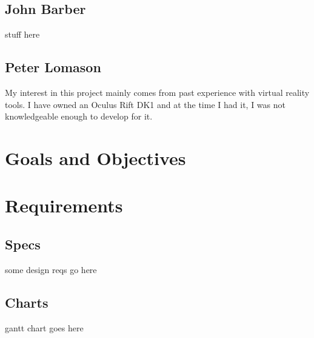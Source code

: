 \documentclass[a4paper,10pt]{article}
\begin{document}
\subsection{John Barber}
stuff here
\subsection{Peter Lomason}
My interest in this project mainly comes from past experience with virtual reality tools. I have owned an Oculus Rift DK1 and at the time I had it, I was not knowledgeable enough to develop for it. 
\section{Goals and Objectives}

\section{Requirements}
\subsection{Specs}
some design reqs go here
\subsection{Charts}
gantt chart goes here
\end{document}
